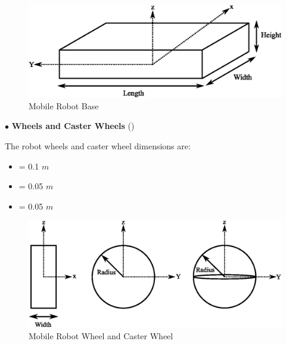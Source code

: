 \begin{figure}[ht]
	\centering
	\includegraphics[scale=1]{images/imagess/3method-imu.eps}
	\caption{Mobile Robot Base}
	\label{fig:Mobile Robot Base}
\end{figure}
\break
$\bullet$ \textbf{Wheels and Caster Wheels} (\textbf{\figureautorefname{ \ref{fig:Mobile Robot Wheel and Caster Wheel}}})\par
The robot wheels and caster wheel dimensions are:
\begin{itemize}
	\item { = 0.1 $m$}
	\item { = 0.05 $m$}
	\item { = 0.05 $m$}
\end{itemize}

\begin{figure}[ht]
	\centering
	\includegraphics[scale=0.9]{images/imagess/3method-wheel.eps} 
	\caption{Mobile Robot Wheel and Caster Wheel}
	\label{fig:Mobile Robot Wheel and Caster Wheel}
\end{figure}

